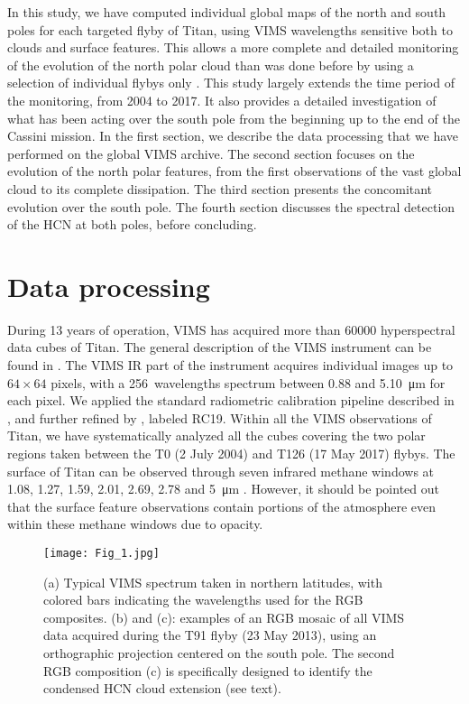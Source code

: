 \documentclass[preprint,twocolumn,5p,authoryear,compress,colorlinks=true]{elsarticle}
\begin{document}
In this study, we have computed individual global maps of the north and south poles for each targeted flyby of Titan, using VIMS wavelengths sensitive both to clouds and surface features. This allows a more complete and detailed monitoring of the evolution of the north polar cloud than was done before by using a selection of individual flybys only \citep{LeMouelic2012}.
This study largely extends the time period of the monitoring, from 2004 to 2017. It also provides a detailed investigation of what has been acting over the south pole from the beginning up to the end of the Cassini mission. In the first section, we describe the data processing that we have performed on the global VIMS archive. The second section focuses on the evolution of the north polar features, from the first observations of the vast global cloud to its complete dissipation. The third section presents the concomitant evolution over the south pole. The fourth section discusses the spectral detection of the HCN at both poles, before concluding.

\section{Data processing}

During 13 years of operation, VIMS has acquired more than \num{60000} hyperspectral data cubes of Titan. The general description of the VIMS instrument can be found in \cite{Brown2004}. The VIMS IR part of the instrument acquires individual images up to $64 \times 64$ pixels, with a \SI{256}{wavelengths} spectrum between \num{0.88} and \SI{5.10}{{\um}} for each pixel. We applied the standard radiometric calibration pipeline described in \cite{Barnes2007}, and further refined by \cite{Clark2018}, labeled RC19. Within all the VIMS observations of Titan, we have systematically analyzed all the cubes covering the two polar regions taken between the T0 (2 July 2004) and T126 (17 May 2017) flybys. The surface of Titan can be observed through seven infrared methane windows at \num{1.08}, \num{1.27}, \num{1.59}, \num{2.01}, \num{2.69}, \num{2.78} and \SI{5}{{\um}} \citep{Sotin2005}. However, it should be pointed out that the surface feature observations contain portions of the atmosphere even within these methane windows due to opacity.

\begin{figure}[!ht]
 \texttt{[image: Fig\_1.jpg]}
 \caption{(a) Typical VIMS spectrum taken in northern latitudes, with colored bars indicating the wavelengths used for the RGB composites. (b) and (c): examples of an RGB mosaic of all VIMS data acquired during the T91 flyby (23 May 2013), using an orthographic projection centered on the south pole. The second RGB composition (c) is specifically designed to identify the condensed HCN cloud extension (see text).}
 \label{fig:spectra}
\end{figure}
\end{document}
